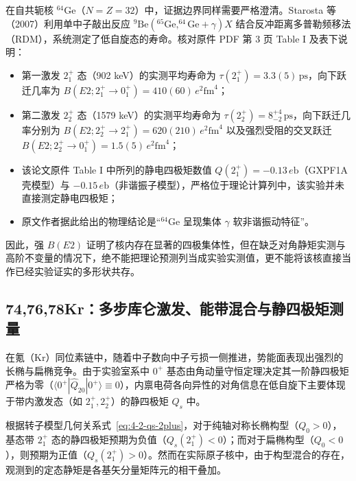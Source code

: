 在自共轭核 $^{64}\mathrm{Ge}$（$N=Z=32$）中，证据边界同样需要严格澄清。Starosta 等（2007）\cite{doctoral-r1-g26-starosta-2007-64ge-rdm-e2}利用单中子敲出反应 $^{9}\mathrm{Be}(^{65}\mathrm{Ge}, ^{64}\mathrm{Ge}+\gamma)X$ 结合反冲距离多普勒频移法（RDM），系统测定了低自旋态的寿命。核对原件 PDF 第 3 页 Table I 及表下说明：
\begin{itemize}
\item 第一激发 $2^+_1$ 态（902 keV）的实测平均寿命为 $\tau(2^+_1) = 3.3(5)\,\mathrm{ps}$，向下跃迁几率为 $B(E2; 2^+_1 \to 0^+_1) = 410(60)\,e^2\mathrm{fm}^4$；
\item 第二激发 $2^+_2$ 态（1579 keV）的实测平均寿命为 $\tau(2^+_2) = 8^{+4}_{-2}\,\mathrm{ps}$，向下跃迁几率分别为 $B(E2; 2^+_2 \to 2^+_1) = 620(210)\,e^2\mathrm{fm}^4$ 以及强烈受阻的交叉跃迁 $B(E2; 2^+_2 \to 0^+_1) = 1.5(5)\,e^2\mathrm{fm}^4$；
\item 该论文原件 Table I 中所列的静电四极矩数值 $Q(2^+_1) = -0.13\,e\mathrm{b}$（GXPF1A 壳模型）与 $-0.15\,e\mathrm{b}$（非谐振子模型），严格位于理论计算列中，该实验并未直接测定静电四极矩；
\item 原文作者据此给出的物理结论是``$^{64}\mathrm{Ge}$ 呈现集体 $\gamma$ 软非谐振动特征''。
\end{itemize}
因此，强 $B(E2)$ 证明了核内存在显著的四极集体性，但在缺乏对角静矩实测与高阶不变量的情况下，绝不能把理论预测列当成实验实测值，更不能将该核直接当作已经实验证实的多形状共存。

\subsection{74,76,78Kr：多步库仑激发、能带混合与静四极矩测量}\label{sec:4-2-3}

在氪（$\mathrm{Kr}$）同位素链中，随着中子数向中子亏损一侧推进，势能面表现出强烈的长椭与扁椭竞争。由于实验室系中 $0^+$ 基态由角动量守恒定理决定其一阶静四极矩严格为零（$\langle 0^+ | \hat{Q}_{20} | 0^+ \rangle \equiv 0$），内禀电荷各向异性的对角信息在低自旋下主要体现于带内激发态（如 $2^+_1, 2^+_2$）的静四极矩 $Q_s$ 中。

根据转子模型几何关系式~\eqref{eq:4-2-qs-2plus}，对于纯轴对称长椭构型（$Q_0 > 0$），基态带 $2^+_1$ 态的静四极矩预期为负值（$Q_s(2^+_1) < 0$）；而对于扁椭构型（$Q_0 < 0$），则预期为正值（$Q_s(2^+_1) > 0$）。然而在实际原子核中，由于构型混合的存在，观测到的定态静矩是各基矢分量矩阵元的相干叠加。

